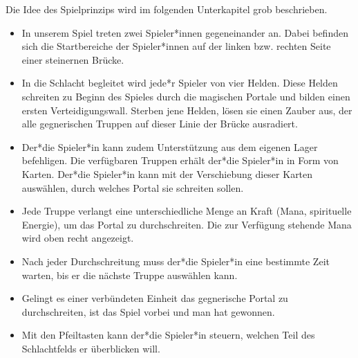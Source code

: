 Die Idee des Spielprinzips wird im folgenden Unterkapitel grob beschrieben.\
\begin{itemize}
    \item In unserem Spiel treten zwei Spieler*innen gegeneinander an. Dabei befinden sich die Startbereiche der Spieler*innen auf der linken bzw. rechten Seite einer steinernen Brücke.
    \item In die Schlacht begleitet wird jede*r Spieler von vier Helden. Diese Helden schreiten zu Beginn des Spieles durch die magischen Portale und bilden einen ersten Verteidigungswall.
    Sterben jene Helden, lösen sie einen Zauber aus, der alle gegnerischen Truppen auf dieser Linie der Brücke ausradiert.
    \item Der*die Spieler*in kann zudem Unterstützung aus dem eigenen Lager befehligen. Die verfügbaren Truppen erhält der*die Spieler*in in Form von Karten. Der*die Spieler*in kann mit der Verschiebung dieser Karten auswählen, durch welches Portal sie schreiten sollen.
    \item Jede Truppe verlangt eine unterschiedliche Menge an Kraft (Mana, spirituelle Energie), um das Portal zu durchschreiten. Die zur Verfügung stehende Mana wird oben recht angezeigt.
    \item Nach jeder Durchschreitung muss der*die Spieler*in eine bestimmte Zeit warten, bis er die nächste Truppe auswählen kann.
    \item Gelingt es einer verbündeten Einheit das gegnerische Portal zu durchschreiten, ist das Spiel vorbei und man hat gewonnen. 
    \item Mit den Pfeiltasten kann der*die Spieler*in steuern, welchen Teil des Schlachtfelds er überblicken will.
\end{itemize}



